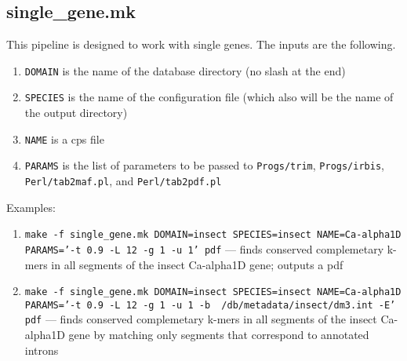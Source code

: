 \documentclass{article}
\begin{document}
\subsection{single\_gene.mk}
This pipeline is designed to work with single genes. The inputs are the following.
\begin{enumerate}
\item {\tt DOMAIN} is the name of the database directory (no slash at the end)
\item {\tt SPECIES} is the name of the configuration file (which also will be the name of the output directory)
\item {\tt NAME} is a cps file
\item {\tt PARAMS} is the list of parameters to be passed to {\tt Progs/trim}, {\tt Progs/irbis}, {\tt Perl/tab2maf.pl}, and {\tt Perl/tab2pdf.pl}
\end{enumerate}

Examples:
\begin{enumerate}
\item {\tt make -f single\_gene.mk DOMAIN=insect SPECIES=insect NAME=Ca-alpha1D PARAMS='-t 0.9 -L 12 -g 1 -u 1' pdf} --- finds conserved complemetary k-mers in all segments of the insect Ca-alpha1D gene; outputs a pdf
\item {\tt make -f single\_gene.mk DOMAIN=insect SPECIES=insect NAME=Ca-alpha1D PARAMS='-t 0.9 -L 12 -g 1 -u 1 -b ~/db/metadata/insect/dm3.int -E' pdf} --- finds conserved complemetary k-mers in all segments of the insect Ca-alpha1D gene by matching only segments that correspond to annotated introns
\end{enumerate}
\end{document}
